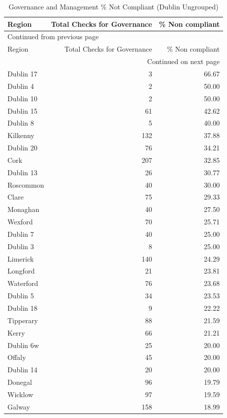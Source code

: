 \documentclass[a4paper,11pt,twoside]{article}
\begin{document}
\begin{longtable}{lrr}
\caption{Governance and Management \% Not Compliant (Dublin Ungrouped)}
\\[0pt]
Region & Total Checks for Governance & \% Non compliant\\[0pt]
\hline
\endfirsthead
\multicolumn{3}{l}{Continued from previous page} \\[0pt]
\hline

Region & Total Checks for Governance & \% Non compliant \\[0pt]

\hline
\endhead
\hline\multicolumn{3}{r}{Continued on next page} \\
\endfoot
\endlastfoot
\hline
Dublin 17 & 3 & 66.67\\[0pt]
Dublin 4 & 2 & 50.00\\[0pt]
Dublin 10 & 2 & 50.00\\[0pt]
Dublin 15 & 61 & 42.62\\[0pt]
Dublin 8 & 5 & 40.00\\[0pt]
Kilkenny & 132 & 37.88\\[0pt]
Dublin 20 & 76 & 34.21\\[0pt]
Cork & 207 & 32.85\\[0pt]
Dublin 13 & 26 & 30.77\\[0pt]
Roscommon & 40 & 30.00\\[0pt]
Clare & 75 & 29.33\\[0pt]
Monaghan & 40 & 27.50\\[0pt]
Wexford & 70 & 25.71\\[0pt]
Dublin 7 & 40 & 25.00\\[0pt]
Dublin 3 & 8 & 25.00\\[0pt]
Limerick & 140 & 24.29\\[0pt]
Longford & 21 & 23.81\\[0pt]
Waterford & 76 & 23.68\\[0pt]
Dublin 5 & 34 & 23.53\\[0pt]
Dublin 18 & 9 & 22.22\\[0pt]
Tipperary & 88 & 21.59\\[0pt]
Kerry & 66 & 21.21\\[0pt]
Dublin 6w & 25 & 20.00\\[0pt]
Offaly & 45 & 20.00\\[0pt]
Dublin 14 & 20 & 20.00\\[0pt]
Donegal & 96 & 19.79\\[0pt]
Wicklow & 97 & 19.59\\[0pt]
Galway & 158 & 18.99\\[0pt]

\end{longtable}
\end{document}
